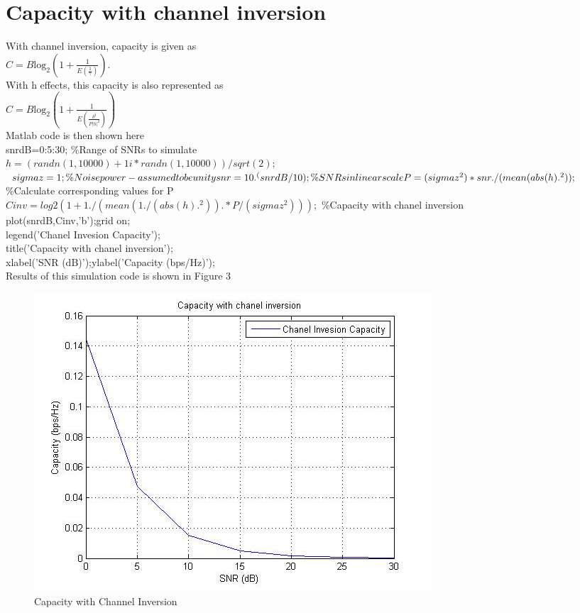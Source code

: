 \documentclass{article}
\begin{document}
\section{Capacity with channel inversion }
With channel inversion, capacity is given as\\ $C=B{\mathrm{log}}_{2}\left(1+\frac{1}{E\left(\frac{1}{\gamma}\right)}\right)$.\\ With h effects, this capacity is also represented as\\ $C=B{\mathrm{log}}_{2}\left(1+\frac{1}{E\left(\frac{{\delta }^{2}}{P{\left|h\right|}^{2}}\right)}\right)$\\
Matlab code is then shown here\\
snrdB=0:5:30; \%Range of SNRs to simulate\\
$h= (randn(1,10000) + 1i*randn(1,10000) )/sqrt(2);$ %
$sigmaz=1; \%Noise power - assumed to be unity\\
snr = 10.^(snrdB/10); \%SNRs in linear scale\\
P=(sigmaz^2)*snr./(mean(abs(h).^2));$ \%Calculate corresponding values for P\\

$Cinv= log2(1+ 1./(mean(1./(abs(h).^2)).*P/(sigmaz^2)));$ \%Capacity with chanel inversion\\
plot(snrdB,Cinv,'b');grid on;\\

legend('Chanel Invesion Capacity');\\
title('Capacity with chanel inversion');\\
xlabel('SNR (dB)');ylabel('Capacity (bps/Hz)');\\

Results of this simulation code is shown in Figure 3\\
\begin{figure}
	\centering
	\includegraphics[width=1\linewidth]{Chanel_inv}
	\caption{Capacity with Channel Inversion}
	\label{fig:Chanel_inv}
\end{figure}
\end{document}
